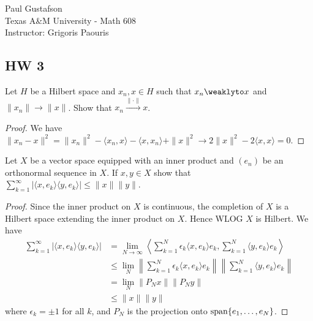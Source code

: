\documentclass{article}
\begin{document}
\noindent Paul Gustafson\\
\noindent Texas A\&M University - Math 608 \\ 
\noindent Instructor: Grigoris Paouris


\subsection*{HW 3}
 Let $H$ be a Hilbert space and $x_n, x \in H$ such that $x_n \weaklyto x$ and $\|x_n\| \to \|x\|$. Show that $x_n \overset{\| \cdot \|}{\to} x$.
\begin{proof}
We have $\|x_n - x\|^2 = \|x_n\|^2 - \langle x_n, x \rangle - \langle x, x_n \rangle + \|x\|^2 \to 2\|x\|^2 - 2 \langle x, x \rangle = 0$.
\end{proof}

 Let $X$ be a vector space equipped with an inner product and $(e_n)$ be an orthonormal sequence in $X$. If $x,y \in X$ show that $\sum_{k=1}^\infty | \langle x, e_k \rangle \langle y, e_k \rangle | \le \|x\| \|y\|$.
\begin{proof}
Since the inner product on $X$ is continuous, the completion of $X$ is a Hilbert space extending the inner product on $X$. Hence WLOG $X$ is Hilbert. We have 
\begin{align*}
\sum_{k=1}^\infty | \langle x, e_k \rangle \langle y, e_k \rangle| & = 
\lim_{N \to \infty} \left\langle \sum_{k=1}^N \epsilon_k \langle x, e_k \rangle e_k , \sum_{k=1}^N \langle y, e_k \rangle e_k \right\rangle
\\ & \le \lim_N \left \|\sum_{k=1}^N \epsilon_k \langle x, e_k \rangle e_k \right\| \left\| \sum_{k=1}^N \langle y, e_k \rangle e_k \right\|
\\ & = \lim_N \|P_{N} x\| \|P_{N} y\|
\\ & \le \|x\| \|y\|
\end{align*}
where $\epsilon_k = \pm 1$ for all $k$, and $P_N$ is the projection onto $\operatorname{span}\{e_1, \ldots, e_N\}$.
\end{proof}
\end{document}
